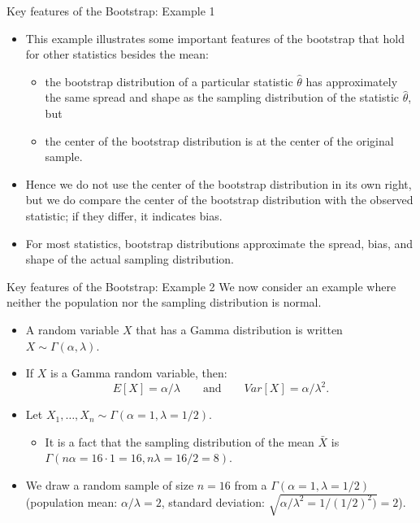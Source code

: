 \documentclass[
  ignorenonframetext,
]{beamer}
\providecommand{\tightlist}{%
  \setlength{\itemsep}{0pt}\setlength{\parskip}{0pt}}
\begin{document}
\begin{frame}{Key features of the Bootstrap: Example 1}
\protect\hypertarget{key-features-of-the-bootstrap-example-1-4}{}
\begin{itemize}
\item
  This example illustrates some important features of the bootstrap that
  hold for other statistics besides the mean:

  \begin{itemize}
  \tightlist
  \item
    the bootstrap distribution of a particular statistic
    \(\hat{\theta}\) has approximately the same spread and shape as the
    sampling distribution of the statistic \(\hat{\theta}\), but
  \item
    the center of the bootstrap distribution is at the center of the
    original sample.
  \end{itemize}
\item
  Hence we do not use the center of the bootstrap distribution in its
  own right, but we do compare the center of the bootstrap distribution
  with the observed statistic; if they differ, it indicates bias.
\item
  For most statistics, bootstrap distributions approximate the spread,
  bias, and shape of the actual sampling distribution.
\end{itemize}
\end{frame}

\begin{frame}{Key features of the Bootstrap: Example 2}
\protect\hypertarget{key-features-of-the-bootstrap-example-2}{}
We now consider an example where neither the population nor the sampling
distribution is normal.

\begin{itemize}
\item
  A random variable \(X\) that has a Gamma distribution is written
  \(X\sim \Gamma(\alpha, \lambda)\).
\item
  If \(X\) is a Gamma random variable, then:
  \[E[X]=\alpha/\lambda \quad \quad \text{and} \quad \quad Var[X]=\alpha/\lambda^2.\]
\item
  Let \(X_1, \ldots, X_n\sim \Gamma(\alpha = 1, \lambda = 1/2)\).

  \begin{itemize}
  \tightlist
  \item
    It is a fact that the sampling distribution of the mean \(\bar{X}\)
    is \(\Gamma(n\alpha = 16\cdot 1 = 16, n\lambda = 16/2 = 8)\).
  \end{itemize}
\item
  We draw a random sample of size \(n=16\) from a
  \(\Gamma(\alpha=1, \lambda=1/2)\) (population mean:
  \(\alpha/\lambda= 2\), standard deviation:
  \(\sqrt{\alpha/\lambda^2 = 1/(1/2)^2)}=2\)).
\end{itemize}
\end{frame}
\end{document}
